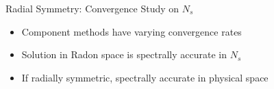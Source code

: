 \documentclass{beamer}
\begin{document}
\begin{frame}{Radial Symmetry: Convergence Study on $N_s$}
    \centering
    \hspace{-15mm}
    \begin{itemize}
        \item Component methods have varying convergence rates
        \item Solution in Radon space is spectrally accurate in $N_s$
        \item If radially symmetric, spectrally accurate in physical space
    \end{itemize}    
\end{frame}
\end{document}
